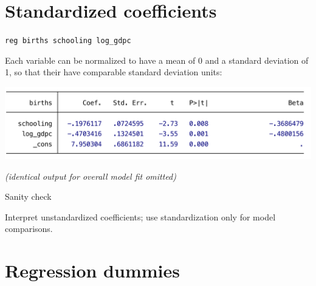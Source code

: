 \documentclass[t]{beamer}
\begin{document}
		\section{Standardized coefficients}

	\begin{frame}[t]{\texttt{reg births schooling log\_gdpc}}

		Each variable can be normalized to have a mean of 0 and a standard deviation of 1, so that their  have comparable standard deviation units:
		
		\includegraphics[scale=.45]{mreg-output-beta.pdf}

		\footnotesize{\textit{(identical output for overall model fit omitted)}}
		
		\begin{alertblock}{Sanity check}

			Interpret unstandardized coefficients; use standardization only for model comparisons.

		\end{alertblock}

	\end{frame}

		\section{Regression dummies}
\end{document}
